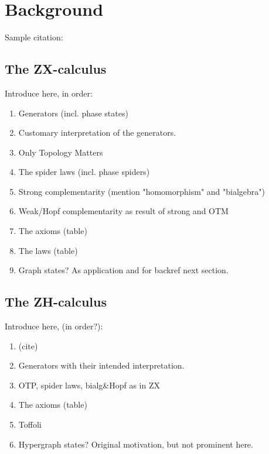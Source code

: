\chapter{Background}\label{chap:background}

Sample citation: \cite{backens2018zhcalculus}

\section{The ZX-calculus}\label{sec:zx-background}

\begin{TODOLIST}
Introduce here, in order:
\begin{enumerate}
\item Generators (incl. phase states)
\item Customary interpretation of the generators.
\item Only Topology Matters
\item The spider laws (incl. phase spiders)
\item Strong complementarity (mention "homomorphism" and "bialgebra")
\item Weak/Hopf complementarity as result of strong and OTM
\item The axioms (table)
\item The laws (table)
\item Graph states? As application and for backref next section.
\end{enumerate}
\end{TODOLIST}

\section{The ZH-calculus}\label{sec:zh-background}

\begin{TODOLIST}
Introduce here, (in order?):
\begin{enumerate}
\item (cite)
\item Generators with their intended interpretation.
\item OTP, spider laws, bialg\&Hopf as in ZX
\item The axioms (table)
\item Toffoli
\item Hypergraph states? Original motivation, but not prominent here.
\end{enumerate} 
\end{TODOLIST}

